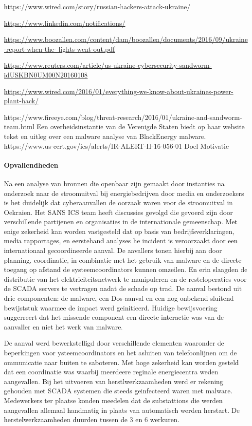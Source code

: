 		\url{	https://www.wired.com/story/russian-hackers-attack-ukraine/}
	
		\url{	https://www.linkedin.com/notifications/}
	
		\url{https://www.boozallen.com/content/dam/boozallen/documents/2016/09/ukraine-report-when-the-
			lights-went-out.pdf}
		
		\url{https://www.reuters.com/article/us-ukraine-cybersecurity-sandworm-idUSKBN0UM00N20160108}
		
		\url{https://www.wired.com/2016/01/everything-we-know-about-ukraines-power-plant-hack/}
		
		
		https://www.fireeye.com/blog/threat-research/2016/01/ukraine-and-sandworm-team.html
		Een overheidsinstantie van de Verenigde Staten biedt op haar website tekst en uitleg over een
		malware analyse van BlackEnergy malware.
		https://www.us-cert.gov/ics/alerts/IR-ALERT-H-16-056-01
		Doel
		Motivatie
		\paragraph{Opvallendheden}
		
		
		Na een analyse van bronnen die openbaar zijn gemaakt door instanties na onderzoek naar de
		stroomuitval bij energiebedrijven door media en onderzoekers is het duidelijk dat cyberaanvallen de
		oorzaak waren voor de stroomuitval in Oekraien. Het SANS ICS team heeft discussies gevolgd die
		gevoerd zijn door verschillende partijenen en organisaties in de internationale gemeenschap. Met
		enige zekerheid kan worden vastgesteld dat op basis van bedrijfsverklaringen, media rapportages, en
		eerstehand analyses he incident is veroorzaakt door een internationaal gecoordineerde aanval.
		De aavallers tonen hierbij aan door planning, coordinatie, in combinatie met het gebruik van
		malware en de directe toegang op afstand de systeemcoordinators kunnen omzeilen. En erin
		slaagden de distributie van het elektriciteitsnetwerk te manipuleren en de resteloperaties voor de
		SCADA servers te vertragen nadat de schade op trad. De aanval bestond uit drie componenten: de
		malware, een Dos-aanval en een nog onbekend sluitend bewijststuk waarmee de impact werd
		geinitieerd. Huidige bewijsvoering suggerreert dat het missende component een directe interactie
		was van de aanvaller en niet het werk van malware.
		
		De aanval werd bewerkstelligd door verschillende elementen waaronder de beperkingen voor
		ysteemcoordinators en het asluiten van telefoonlijnen om de ommunicatie naar buiten te saboteren.
		Met hoge zekerheid kan worden gesteld dat een coordinatie was waarbij meerdeere reginale
		energiecentra weden aangevallen.
		Bij het uitvoeren van herstlwerkzaamheden werd er rekening gehouden met SCADA systemen die
		steeds geinfecteerd waren met malware. Medewerkers ter plaatse konden meedelen dat de
		substattions die werden aangevallen allemaal handmatig in plaats van automatisch werden herstart.
		De herstelwerkzaamheden duurden tussen de 3 en 6 werkuren.
		
